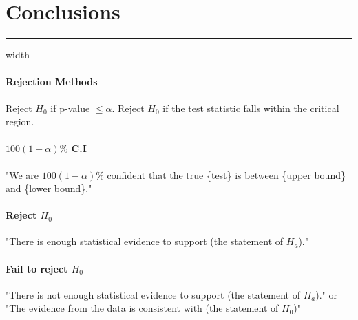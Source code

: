 \documentclass[10pt]{article}
\begin{document}
\section*{Conclusions}
\hrule width \textwidth
\vspace{6pt}
\paragraph{Rejection Methods} Reject $H_0$ if p-value $\leq \alpha$. Reject $H_0$ if the test statistic falls within the critical region.
\paragraph{$100(1-\alpha)\%$ C.I} "We are $100(1-\alpha)\%$ confident that the true \{test\} is between \{upper bound\} and \{lower bound\}."
\paragraph{Reject $H_0$} "There is enough statistical evidence to support (the statement of $H_a$)."
\paragraph{Fail to reject $H_0$} "There is not enough statistical evidence to support (the statement of $H_a$)."
or "The evidence from the data is consistent with (the statement of $H_0$)"


\end{document}
